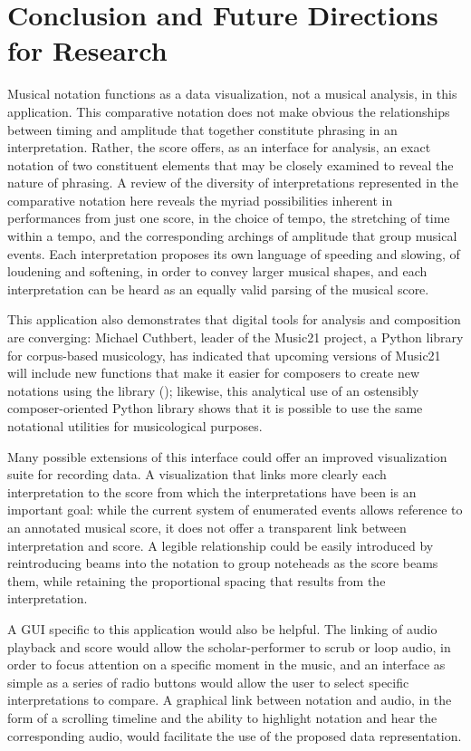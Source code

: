 \section{Conclusion and Future Directions for Research}

Musical notation functions as a data visualization, not a musical analysis, in this application. This comparative notation does not make obvious the relationships between timing and amplitude that together constitute phrasing in an interpretation. Rather, the score offers, as an interface for analysis, an exact notation of two constituent elements that may be closely examined to reveal the nature of phrasing. A review of the diversity of interpretations represented in the comparative notation here reveals the myriad possibilities inherent in performances from just one score, in the choice of tempo, the stretching of time within a tempo, and the corresponding archings of amplitude that group musical events. Each interpretation proposes its own language of speeding and slowing, of loudening and softening, in order to convey larger musical shapes, and each interpretation can be heard as an equally valid parsing of the musical score.

This application also demonstrates that digital tools for analysis and composition are converging: Michael Cuthbert, leader of the Music21 project, a Python library for corpus-based musicology, has indicated that upcoming versions of Music21 will include new functions that make it easier for composers to create new notations using the library (\cite{Cuthbert:2013ys}); likewise, this analytical use of an ostensibly composer-oriented Python library shows that it is possible to use the same notational utilities for musicological purposes.

Many possible extensions of this interface could offer an improved visualization suite for recording data. A visualization that links more clearly each interpretation to the score from which the interpretations have been is an important goal: while the current system of enumerated events allows reference to an annotated musical score, it does not offer a transparent link between interpretation and score. A legible relationship could be easily introduced by reintroducing beams into the notation to group noteheads as the score beams them, while retaining the proportional spacing that results from the interpretation.

A GUI specific to this application would also be helpful. The linking of audio playback and score would allow the scholar-performer to scrub or loop audio, in order to focus attention on a specific moment in the music, and an interface as simple as a series of radio buttons would allow the user to select specific interpretations to compare. A graphical link between notation and audio, in the form of a scrolling timeline and the ability to highlight notation and hear the corresponding audio, would facilitate the use of the proposed data representation.